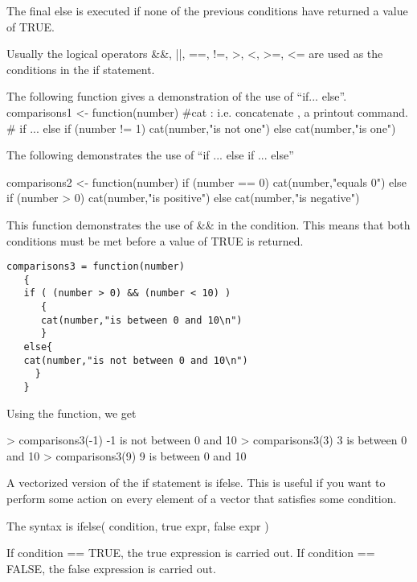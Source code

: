 The final else is executed if none of the previous conditions have returned a value of TRUE.

Usually the logical operators &&, ||, ==, !=, >, <, >=, <= are used
as the conditions in the if statement.

The following function gives a demonstration of the use of “if... else”.
comparisons1 <- function(number)
#cat :  i.e. concatenate ,  a printout command.
   {
   # if ... else
   if (number != 1)
       {
       cat(number,"is not one\n")
       }
    else
       {
       cat(number,"is one\n")
       }
    }


The following demonstrates the use of “if ... else if ... else”

comparisons2 <- function(number)
  {
  if (number == 0)
      {
       cat(number,"equals 0\n")
      }
  else if (number > 0)
      {
       cat(number,"is positive\n")
      }
  else{
      cat(number,"is negative\n")
      }
  }


This function demonstrates the use of && in the condition. This means that both conditions must be met before a value of TRUE is returned.



\begin{framed}
\begin{verbatim}
comparisons3 = function(number)
   {
   if ( (number > 0) && (number < 10) )
      {
      cat(number,"is between 0 and 10\n")
      }
   else{
   cat(number,"is not between 0 and 10\n")
     }
   }
\end{verbatim}
\end{framed}


Using the function, we get

> comparisons3(-1)
-1 is not between 0 and 10
> comparisons3(3)
3 is between 0 and 10
> comparisons3(9)
9 is between 0 and 10

A vectorized version of the if statement is ifelse. This is useful if you want to perform some action on every element of a vector that satisfies some condition.

The syntax is
ifelse( condition, true expr, false expr )

If condition == TRUE, the true expression is carried out. 
If condition == FALSE, the false expression is carried out.

